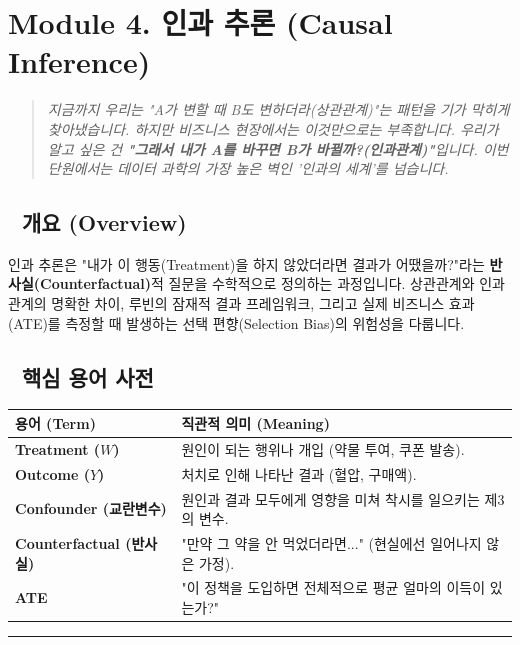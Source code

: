 \documentclass[11pt,a4paper]{book}
\theoremstyle{definition}
\begin{document}
\section{Module 4. 인과 추론 (Causal Inference)}

\begin{quote}
\textit{지금까지 우리는 "A가 변할 때 B도 변하더라(상관관계)"는 패턴을 기가 막히게 찾아냈습니다. 하지만 비즈니스 현장에서는 이것만으로는 부족합니다. 우리가 알고 싶은 건 \textbf{"그래서 내가 A를 바꾸면 B가 바뀔까?(인과관계)"}입니다. 이번 단원에서는 데이터 과학의 가장 높은 벽인 '인과의 세계'를 넘습니다.}
\end{quote}

\subsection*{📌 개요 (Overview)}
인과 추론은 "내가 이 행동(Treatment)을 하지 않았더라면 결과가 어땠을까?"라는 \textbf{반사실(Counterfactual)}적 질문을 수학적으로 정의하는 과정입니다. 상관관계와 인과관계의 명확한 차이, 루빈의 잠재적 결과 프레임워크, 그리고 실제 비즈니스 효과(ATE)를 측정할 때 발생하는 선택 편향(Selection Bias)의 위험성을 다룹니다.

\subsection*{📝 핵심 용어 사전}
\begin{table}[h]
\centering
\begin{tabularx}{\textwidth}{|p{}|X|}
\hline
\textbf{용어 (Term)} & \textbf{직관적 의미 (Meaning)} \\
\hline
\textbf{Treatment ($W$)} & 원인이 되는 행위나 개입 (약물 투여, 쿠폰 발송). \\
\hline
\textbf{Outcome ($Y$)} & 처치로 인해 나타난 결과 (혈압, 구매액). \\
\hline
\textbf{Confounder (교란변수)} & 원인과 결과 모두에게 영향을 미쳐 착시를 일으키는 제3의 변수. \\
\hline
\textbf{Counterfactual (반사실)} & "만약 그 약을 안 먹었더라면..." (현실에선 일어나지 않은 가정). \\
\hline
\textbf{ATE} & "이 정책을 도입하면 전체적으로 평균 얼마의 이득이 있는가?" \\
\hline
\end{tabularx}
\end{table}

\vspace{0.5cm}\hrule\vspace{0.5cm}
\end{document}
